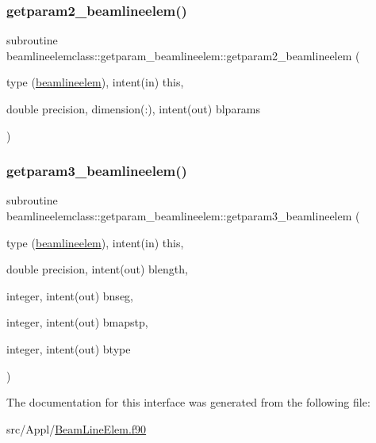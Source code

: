 \mbox{\label{interfacebeamlineelemclass_1_1getparam__beamlineelem_a22cc3120bbfd4a2f16c7824dcd501614}} 
\subsubsection{\texorpdfstring{getparam2\_beamlineelem()}{getparam2\_beamlineelem()}}
{\footnotesize\ttfamily subroutine beamlineelemclass\+::getparam\+\_\+beamlineelem\+::getparam2\+\_\+beamlineelem (\begin{DoxyParamCaption}\item[{type (\mbox{\hyperlink{namespacebeamlineelemclass_structbeamlineelemclass_1_1beamlineelem}{beamlineelem}}), intent(in)}]{this,  }\item[{double precision, dimension(\+:), intent(out)}]{blparams }\end{DoxyParamCaption})}

\mbox{\label{interfacebeamlineelemclass_1_1getparam__beamlineelem_adfbc3eec44b2546e0887530537bb256b}} 
\subsubsection{\texorpdfstring{getparam3\_beamlineelem()}{getparam3\_beamlineelem()}}
{\footnotesize\ttfamily subroutine beamlineelemclass\+::getparam\+\_\+beamlineelem\+::getparam3\+\_\+beamlineelem (\begin{DoxyParamCaption}\item[{type (\mbox{\hyperlink{namespacebeamlineelemclass_structbeamlineelemclass_1_1beamlineelem}{beamlineelem}}), intent(in)}]{this,  }\item[{double precision, intent(out)}]{blength,  }\item[{integer, intent(out)}]{bnseg,  }\item[{integer, intent(out)}]{bmapstp,  }\item[{integer, intent(out)}]{btype }\end{DoxyParamCaption})}



The documentation for this interface was generated from the following file\+:\begin{DoxyCompactItemize}
\item 
src/\+Appl/\mbox{\hyperlink{_beam_line_elem_8f90}{Beam\+Line\+Elem.\+f90}}\end{DoxyCompactItemize}

